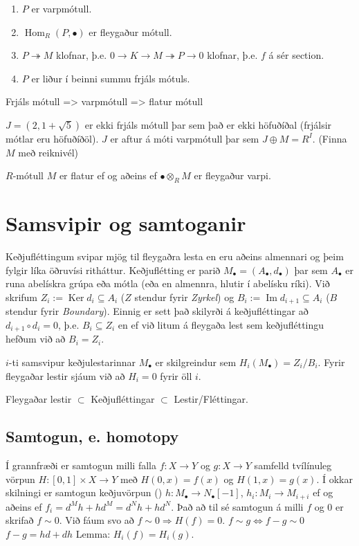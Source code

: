 \documentclass[a4paper, 14pt]{article}
\DeclareMathOperator{\Hom}{Hom}
\DeclareMathOperator{\Ker}{Ker}
\let\tensor\otimes
\let\dsum\oplus
\newcommand{\then}{\Longrightarrow}
\renewcommand{\Im}{\operatorname{Im}}
\begin{document}
\begin{enumerate}
\item $P$ er varpmótull.
\item $\Hom_R(P, \bullet)$ er fleygaður mótull.
\item $P \twoheadrightarrow M$ klofnar, þ.e. $0 \to K \to M \twoheadrightarrow P \to 0$ klofnar, þ.e. $f$ á sér section.
\item $P$ er liður í beinni summu frjáls mótuls.
\end{enumerate}

Frjáls mótull => varpmótull => flatur mótull

$J = (2, 1 + \sqrt{5})$ er ekki frjáls mótull þar sem það er ekki höfuðíðal (frjálsir mótlar eru höfuðíðöl).
$J$ er aftur á móti varpmótull þar sem $J \dsum M = R^I $. (Finna $M$ með reiknivél)

$R$-mótull $M$ er flatur ef og aðeins ef $\bullet \tensor_R M$ er fleygaður varpi.

\section{Samsvipir og samtoganir}

Keðjufléttingum svipar mjög til fleygaðra lesta en eru aðeins almennari og þeim fylgir líka öðruvísi ritháttur.
Keðjuflétting er parið $M_\bullet=(A_\bullet, d_\bullet)$ þar sem $A_\bullet$ er runa abelískra grúpa eða mótla (eða en almennra, hlutir í 
abelísku ríki). Við skrifum $Z_i := \Ker d_i \subseteq A_i$ ($Z$ stendur fyrir \emph{Zyrkel}) og $B_i := \Im d_{i+1} \subseteq A_i$ 
($B$ stendur fyrir \emph{Boundary}). 
Einnig er sett það skilyrði á keðjufléttingar að $d_{i+1} \circ d_i = 0$, þ.e. $B_i \subseteq Z_i$ en ef við litum á 
fleygaða lest sem keðjufléttingu hefðum við að $B_i = Z_i$.

$i$-ti samsvipur keðjulestarinnar $M_\bullet$ er skilgreindur sem $H_i(M_\bullet) = Z_i / B_i$. Fyrir fleygaðar lestir 
sjáum við að $H_i = 0$ fyrir öll $i$.

Fleygaðar lestir $\subset$ Keðjufléttingar $\subset$ Lestir/Fléttingar.

\subsection{Samtogun, e. homotopy}
Í grannfræði er samtogun milli falla $f : X \to Y$ og $g : X \to Y$ samfelld tvílínuleg vörpun 
$H : [0, 1] \times X \to Y$ með  $H(0, x) = f(x)$ og $H(1, x) = g(x)$. 
Í okkar skilningi er samtogun keðjuvörpun () $h : M_\bullet \to N_\bullet[-1]$, $h_i: M_i \to M_{i+i}$
ef og aðeins ef $f_i = d^M h + h d^M = d^N h + h d^N$. Það að til sé samtogun á milli $f$ og 0 er skrifað 
$f \sim 0$.
Við fáum svo að $f \sim 0 \then H(f) = 0.$ 
$f \sim g \iff f-g \sim 0$
$f-g = hd + dh$
Lemma: $H_i(f) = H_i(g)$.
\end{document}
